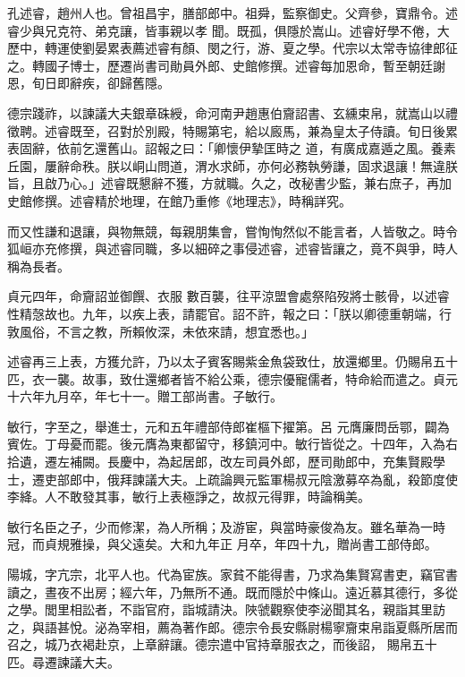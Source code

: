 \begin{pinyinscope}
 孔述睿，趙州人也。曾祖昌宇，膳部郎中。祖舜，監察御史。父齊參，寶鼎令。述睿少與兄克符、弟克讓，皆事親以孝
 聞。既孤，俱隱於嵩山。述睿好學不倦，大歷中，轉運使劉晏累表薦述睿有顏、閔之行，游、夏之學。代宗以太常寺協律郎征之。轉國子博士，歷遷尚書司勛員外郎、史館修撰。述睿每加恩命，暫至朝廷謝恩，旬日即辭疾，卻歸舊隱。



 德宗踐祚，以諫議大夫銀章硃綬，命河南尹趙惠伯齎詔書、玄纁束帛，就嵩山以禮徵聘。述睿既至，召對於別殿，特賜第宅，給以廄馬，兼為皇太子侍讀。旬日後累表固辭，依前乞還舊山。詔報之曰：「卿懷伊摯匡時之
 道，有廣成嘉遁之風。養素丘園，屢辭命秩。朕以峒山問道，渭水求師，亦何必務執勞謙，固求退讓！無違朕旨，且啟乃心。」述睿既懇辭不獲，方就職。久之，改秘書少監，兼右庶子，再加史館修撰。述睿精於地理，在館乃重修《地理志》，時稱詳究。



 而又性謙和退讓，與物無競，每親朋集會，嘗恂恂然似不能言者，人皆敬之。時令狐峘亦充修撰，與述睿同職，多以細碎之事侵述睿，述睿皆讓之，竟不與爭，時人稱為長者。



 貞元四年，命齎詔並御饌、衣服
 數百襲，往平涼盟會處祭陷歿將士骸骨，以述睿性精愨故也。九年，以疾上表，請罷官。詔不許，報之曰：「朕以卿德重朝端，行敦風俗，不言之教，所賴攸深，未依來請，想宜悉也。」



 述睿再三上表，方獲允許，乃以太子賓客賜紫金魚袋致仕，放還鄉里。仍賜帛五十匹，衣一襲。故事，致仕還鄉者皆不給公乘，德宗優寵儒者，特命給而遣之。貞元十六年九月卒，年七十一。贈工部尚書。子敏行。



 敏行，字至之，舉進士，元和五年禮部侍郎崔樞下擢第。呂
 元膺廉問岳鄂，闢為賓佐。丁母憂而罷。後元膺為東都留守，移鎮河中。敏行皆從之。十四年，入為右拾遺，遷左補闕。長慶中，為起居郎，改左司員外郎，歷司勛郎中，充集賢殿學士，遷吏部郎中，俄拜諫議大夫。上疏論興元監軍楊叔元陰激募卒為亂，殺節度使李絳。人不敢發其事，敏行上表極諍之，故叔元得罪，時論稱美。



 敏行名臣之子，少而修潔，為人所稱；及游宦，與當時豪俊為友。雖名華為一時冠，而貞規雅操，與父遠矣。大和九年正
 月卒，年四十九，贈尚書工部侍郎。



 陽城，字亢宗，北平人也。代為宦族。家貧不能得書，乃求為集賢寫書吏，竊官書讀之，晝夜不出房；經六年，乃無所不通。既而隱於中條山。遠近慕其德行，多從之學。閭里相訟者，不詣官府，詣城請決。陜虢觀察使李泌聞其名，親詣其里訪之，與語甚悅。泌為宰相，薦為著作郎。德宗令長安縣尉楊寧齎束帛詣夏縣所居而召之，城乃衣褐赴京，上章辭讓。德宗遣中官持章服衣之，而後詔，
 賜帛五十匹。尋遷諫議大夫。




\end{pinyinscope}
